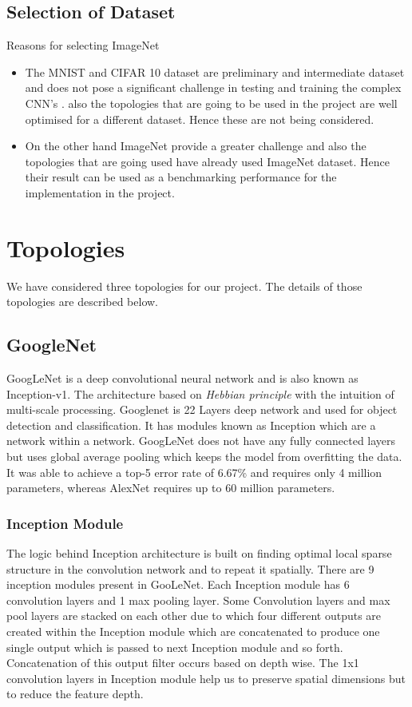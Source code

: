 \documentclass[titlepage]{report}
\begin{document}
\subsection{Selection of Dataset}
Reasons for selecting ImageNet
\begin{itemize}
    \item The MNIST and CIFAR 10 dataset are preliminary and intermediate dataset and does not pose a significant challenge in testing and training the complex CNN’s . also the topologies that are going to be used in the project are well optimised for a different dataset. Hence these are not being considered.
    \item On the other hand ImageNet provide a greater challenge and also the topologies that are going used have already used ImageNet dataset. Hence their result can be used as a benchmarking performance for the implementation in the project.
\end{itemize}



\section{Topologies}
We have considered three topologies for our project. The details of those topologies are described below.

\subsection{GoogleNet}
GoogLeNet is a deep convolutional neural network and is also known as Inception-v1. The architecture based on \textit{Hebbian principle} with the intuition of multi-scale processing. Googlenet is 22 Layers deep network and used for object detection and classification. It has modules known as Inception which are a network within a network. GoogLeNet does not have any fully connected layers but uses global average pooling which keeps the model from overfitting the data.
It was able to achieve a top-5 error rate of 6.67\% and requires only 4 million parameters, whereas AlexNet requires up to 60 million parameters.

\subsubsection{Inception Module}
The logic behind Inception architecture is built on finding optimal local sparse structure in the convolution network and to repeat it spatially. There are 9 inception modules present in GooLeNet. Each Inception module has 6 convolution layers and 1 max pooling layer. Some Convolution layers and max pool layers are stacked on each other due to which four different outputs are created within the Inception module which are concatenated to produce one single output which is passed to next Inception module and so forth. Concatenation of this output filter occurs based on depth wise. The 1x1 convolution layers in Inception module help us to preserve spatial dimensions but to reduce the feature depth.
\end{document}
